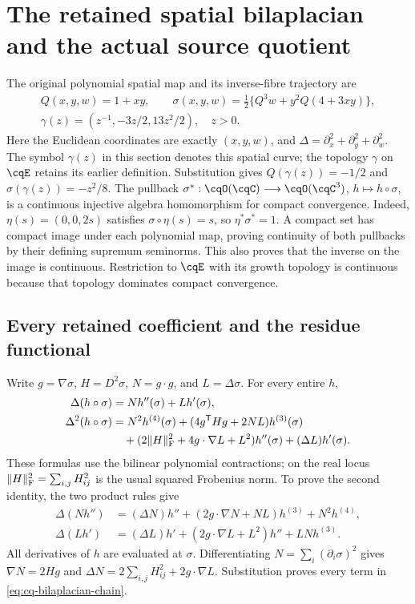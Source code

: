 \section{The retained spatial bilaplacian and the actual source quotient}
\label{sec:cq-bilaplacian-source}

The original polynomial spatial map and its inverse-fibre trajectory are
\begin{gather*}
 Q(x,y,w)=1+xy,\qquad
 \sigma(x,y,w)=\tfrac12\{Q^3w+y^2Q(4+3xy)\},\\
 \gamma(z)=(z^{-1},-3z/2,13z^2/2),\quad z>0.
\end{gather*}
Here the Euclidean coordinates are exactly $(x,y,w)$, and
$\Delta=\partial_x^2+\partial_y^2+\partial_w^2$.
The symbol $\gamma(z)$ in this section denotes this spatial curve;
the topology $\gamma$ on $\cqE$ retains its earlier definition.
Substitution gives $Q(\gamma(z))=-1/2$ and
$\sigma(\gamma(z))=-z^2/8$.
The pullback
$\sigma^*:\cqO(\cqC)\longrightarrow\cqO(\cqC^3)$,
$h\longmapsto h\circ\sigma$, is a continuous injective algebra
homomorphism for compact convergence. Indeed,
$\eta(s)=(0,0,2s)$ satisfies $\sigma\circ\eta(s)=s$,
so $\eta^*\sigma^*=1$. A compact set has compact image under each
polynomial map, proving continuity of both pullbacks by their
defining supremum seminorms. This also proves that the inverse on
the image is continuous. Restriction to $\cqE$ with its growth
topology is continuous because that topology dominates compact
convergence.

\subsection{Every retained coefficient and the residue functional}
Write $g=\nabla\sigma$, $H=D^2\sigma$, $N=g\cdot g$,
and $L=\Delta\sigma$. For every entire $h$,
\begin{align}
 \Delta(h\circ\sigma)&=Nh''(\sigma)+Lh'(\sigma),\notag\\
 \Delta^2(h\circ\sigma)&=
 N^2h^{(4)}(\sigma)+(4g^{\mathsf T}Hg+2NL)h^{(3)}(\sigma)\notag\\
 &\quad+(2\|H\|_{\rm F}^2+4g\cdot\nabla L+L^2)h''(\sigma)
       +(\Delta L)h'(\sigma).
 \label{eq:cq-bilaplacian-chain}
\end{align}
These formulas use the bilinear polynomial contractions; on the
real locus $\|H\|_{\rm F}^2=\sum_{i,j}H_{ij}^2$ is the usual
squared Frobenius norm. To prove the second identity, the two
product rules give
\begin{align*}
 \Delta(Nh'')&=(\Delta N)h''+
   (2g\cdot\nabla N+NL)h^{(3)}+N^2h^{(4)},\\
 \Delta(Lh')&=(\Delta L)h'+
   (2g\cdot\nabla L+L^2)h''+LN h^{(3)}.
\end{align*}
All derivatives of $h$ are evaluated at $\sigma$. Differentiating
$N=\sum_i(\partial_i\sigma)^2$ gives
$\nabla N=2Hg$ and
$\Delta N=2\sum_{i,j}H_{ij}^2+2g\cdot\nabla L$.
Substitution proves every term in
\eqref{eq:cq-bilaplacian-chain}.


